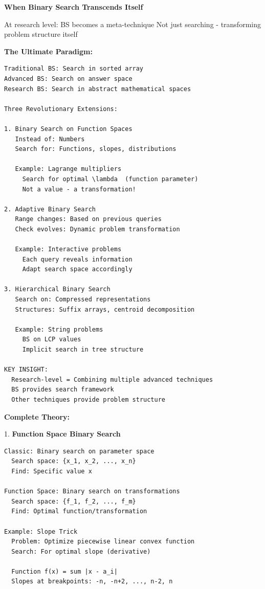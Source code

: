 \documentclass[11pt,a4paper,oneside]{book}
\begin{document}
\begin{tcolorbox}[
    enhanced,breakable,
    colback=white,
    colframe=deepblue,
    boxrule=1.5pt,
    arc=3mm,
    title=\textbf{Beyond Traditional Binary Search}
]
\textbf{When Binary Search Transcends Itself}

At research level: BS becomes a meta-technique
Not just searching - transforming problem structure itself

\textbf{The Ultimate Paradigm:}
\begin{verbatim}
Traditional BS: Search in sorted array
Advanced BS: Search on answer space
Research BS: Search in abstract mathematical spaces

Three Revolutionary Extensions:

1. Binary Search on Function Spaces
   Instead of: Numbers
   Search for: Functions, slopes, distributions
   
   Example: Lagrange multipliers
     Search for optimal \lambda  (function parameter)
     Not a value - a transformation!

2. Adaptive Binary Search
   Range changes: Based on previous queries
   Check evolves: Dynamic problem transformation
   
   Example: Interactive problems
     Each query reveals information
     Adapt search space accordingly

3. Hierarchical Binary Search
   Search on: Compressed representations
   Structures: Suffix arrays, centroid decomposition
   
   Example: String problems
     BS on LCP values
     Implicit search in tree structure

KEY INSIGHT:
  Research-level = Combining multiple advanced techniques
  BS provides search framework
  Other techniques provide problem structure
\end{verbatim}

\textbf{Complete Theory:}

1. \textbf{Function Space Binary Search}
\begin{verbatim}
Classic: Binary search on parameter space
  Search space: {x_1, x_2, ..., x_n}
  Find: Specific value x

Function Space: Binary search on transformations
  Search space: {f_1, f_2, ..., f_m}
  Find: Optimal function/transformation

Example: Slope Trick
  Problem: Optimize piecewise linear convex function
  Search: For optimal slope (derivative)
  
  Function f(x) = sum |x - a_i|
  Slopes at breakpoints: -n, -n+2, ..., n-2, n
  

\end{verbatim}
\end{tcolorbox}
\end{document}
